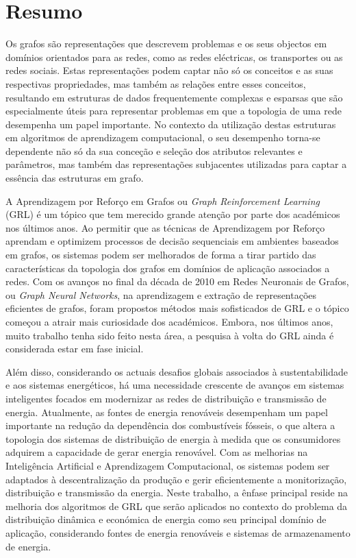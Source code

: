\chapter*{Resumo}

Os grafos são representações que descrevem problemas e os seus objectos em domínios orientados para as redes, como as redes eléctricas, os transportes ou as redes sociais. Estas representações podem captar não só os conceitos e as suas respectivas propriedades, mas também as relações entre esses conceitos, resultando em estruturas de dados frequentemente complexas e esparsas que são especialmente úteis para representar problemas em que a topologia de uma rede desempenha um papel importante. No contexto da utilização destas estruturas em algoritmos de aprendizagem computacional, o seu desempenho torna-se dependente não só da sua conceção e seleção dos atributos relevantes e parâmetros, mas também das representações subjacentes utilizadas para captar a essência das estruturas em grafo. \par
A Aprendizagem por Reforço em Grafos ou \textit{Graph Reinforcement Learning} (GRL) é um tópico que tem merecido grande atenção por parte dos académicos nos últimos anos. Ao permitir que as técnicas de Aprendizagem por Reforço aprendam e optimizem processos de decisão sequenciais em ambientes baseados em grafos, os sistemas podem ser melhorados de forma a tirar partido das características da topologia dos grafos em domínios de aplicação associados a redes. Com os avanços no final da década de 2010 em Redes Neuronais de Grafos, ou \textit{Graph Neural Networks}, na aprendizagem e extração de representações eficientes de grafos, foram propostos métodos mais sofisticados de GRL e o tópico começou a atrair mais curiosidade dos académicos. Embora, nos últimos anos, muito trabalho tenha sido feito nesta área, a pesquisa à volta do GRL ainda é considerada estar em fase inicial. \par
Além disso, considerando os actuais desafios globais associados à sustentabilidade e aos sistemas energéticos, há uma necessidade crescente de avanços em sistemas inteligentes focados em modernizar as redes de distribuição e transmissão de energia. Atualmente, as fontes de energia renováveis desempenham um papel importante na redução da dependência dos combustíveis fósseis, o que altera a topologia dos sistemas de distribuição de energia à medida que os consumidores adquirem a capacidade de gerar energia renovável. Com as melhorias na Inteligência Artificial e Aprendizagem Computacional, os sistemas podem ser adaptados à descentralização da produção e gerir eficientemente a monitorização, distribuição e transmissão da energia. Neste trabalho, a ênfase principal reside na melhoria dos algoritmos de GRL que serão aplicados no contexto  do problema da distribuição dinâmica e económica de energia como seu principal domínio de aplicação, considerando fontes de energia renováveis e sistemas de armazenamento de energia.  \par
